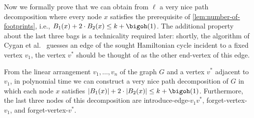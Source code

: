 \documentclass[a4paper,UKenglish,cleveref, autoref, thm-restate]{lipics-v2021}
\begin{document}
Now we formally prove that we can obtain from $\ell$ a very nice path decomposition where every node $x$ satisfies the prerequisite of \cref{lem:number-of-footprints}, i.e., $B_1(x) + 2 \cdot B_2(x) \leq k+\bigoh(1)$.
The additional property about the last three bags is a technicality required later: shortly, the algorithm of Cygan et al.~\cite{DBLP:journals/jacm/CyganKN18} guesses an edge of the sought Hamiltonian cycle incident to a fixed vertex $v_1$, the vertex $v^*$ should be thought of as the other end-vertex of this edge.
\begin{lemma}\label{lem:useful-path-decomposition-hc-ub}
	From the linear arrangement $v_1, \dots, v_n$ of the graph $G$ and a vertex $v^*$ adjacent to $v_1$, 
	in polynomial time we can construct a very nice path decomposition of $G$ in which each node $x$ satisfies $|B_1(x)| + 2 \cdot |B_2(x)| \leq k+\bigoh(1)$.
	Furthermore, the last three nodes of this decomposition are introduce-edge-$v_1 v^*$, forget-vertex-$v_1$, and forget-vertex-$v^*$.
\end{lemma}
\end{document}
